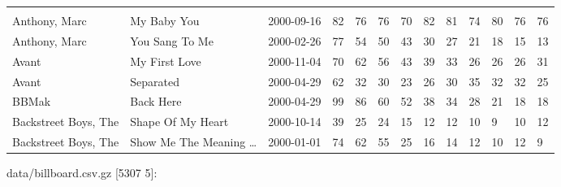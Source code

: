 \documentclass[]{article}
\newenvironment{Shaded}{\begin{snugshade}}{\end{snugshade}}
\newcommand{\StringTok}[1]{\textcolor[rgb]{0.31,0.60,0.02}{#1}}
\newcommand{\VariableTok}[1]{\textcolor[rgb]{0.00,0.00,0.00}{#1}}
\newcommand{\AttributeTok}[1]{\textcolor[rgb]{0.77,0.63,0.00}{#1}}
\newcommand{\NormalTok}[1]{#1}
\begin{document}
\begin{longtable}[]{@{}lllllllllllll@{}}
&\tabularnewline
Anthony, Marc & My Baby You & 2000-09-16 & 82 & 76 & 76 & 70 & 82 & 81 &
74 & 80 & 76 & 76\tabularnewline
Anthony, Marc & You Sang To Me & 2000-02-26 & 77 & 54 & 50 & 43 & 30 &
27 & 21 & 18 & 15 & 13\tabularnewline
Avant & My First Love & 2000-11-04 & 70 & 62 & 56 & 43 & 39 & 33 & 26 &
26 & 26 & 31\tabularnewline
Avant & Separated & 2000-04-29 & 62 & 32 & 30 & 23 & 26 & 30 & 35 & 32 &
32 & 25\tabularnewline
BBMak & Back Here & 2000-04-29 & 99 & 86 & 60 & 52 & 38 & 34 & 28 & 21 &
18 & 18\tabularnewline
Backstreet Boys, The & Shape Of My Heart & 2000-10-14 & 39 & 25 & 24 &
15 & 12 & 12 & 10 & 9 & 10 & 12\tabularnewline
Backstreet Boys, The & Show Me The Meaning \ldots{} & 2000-01-01 & 74 &
62 & 55 & 25 & 16 & 14 & 12 & 10 & 12 & 9\tabularnewline
\bottomrule
\end{longtable}

\begin{Shaded}
\end{Shaded}

data/billboard.csv.gz {[}5307 5{]}:
\end{document}

